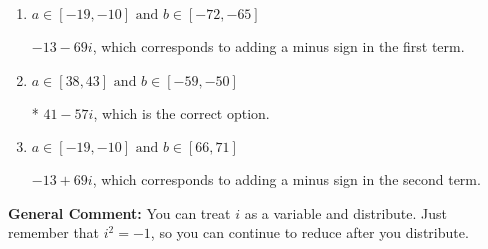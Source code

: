 \documentclass{extbook}[14pt]
\begin{document}
\begin{enumerate}
{\begin{enumerate}[label=\Alph*.]
 $41 + 57 i$, which corresponds to adding a minus sign in both terms.
\item \( a \in [-19, -10] \text{ and } b \in [-72, -65] \)

 $-13 - 69 i$, which corresponds to adding a minus sign in the first term.
\item \( a \in [38, 43] \text{ and } b \in [-59, -50] \)

* $41 - 57 i$, which is the correct option.
\item \( a \in [-19, -10] \text{ and } b \in [66, 71] \)

 $-13 + 69 i$, which corresponds to adding a minus sign in the second term.
\end{enumerate}

\textbf{General Comment:} You can treat $i$ as a variable and distribute. Just remember that $i^2=-1$, so you can continue to reduce after you distribute.
}
\end{enumerate}
\end{document}
